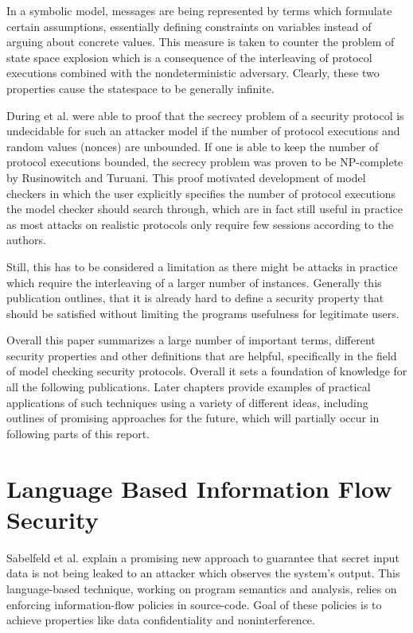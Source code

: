 \documentclass[a4paper,UKenglish]{lipics-v2018}
\begin{document}
In a symbolic model, messages are being represented by terms which formulate certain assumptions, essentially defining constraints on variables instead of arguing about concrete values. This measure is taken to counter the problem of state space explosion which is a consequence of the interleaving of protocol executions combined with the nondeterministic adversary. Clearly, these two properties cause the statespace to be generally infinite.\cite{model_checking_security_protocols}

During et al. were able to proof that the secrecy problem of a security protocol is undecidable for such an attacker model if the number of protocol executions and random values (nonces) are unbounded.\cite{DLMS99} If one is able to keep the number of protocol executions bounded, the secrecy problem was proven to be NP-complete by Rusinowitch and Turuani.\cite{RT01} This proof motivated development of model checkers in which the user explicitly specifies the number of protocol executions the model checker should search through, which are in fact still useful in practice as most attacks on realistic protocols only require few sessions according to the authors.\cite{model_checking_security_protocols}

Still, this has to be considered a limitation as there might be attacks in practice which require the interleaving of a larger number of instances. Generally this publication outlines, that it is already hard to define a security property that should be satisfied without limiting the programs usefulness for legitimate users.

Overall this paper summarizes a large number of important terms, different security properties and other definitions that are helpful, specifically in the field of model checking security protocols. Overall it sets a foundation of knowledge for all the following publications. Later chapters provide examples of practical applications of such techniques using a variety of different ideas, including outlines of promising approaches for the future, which will partially occur in following parts of this report. 



\section{Language Based Information Flow Security}

Sabelfeld et al. explain a promising new approach to guarantee that secret input data is not being leaked to an attacker which observes the system's output. This language-based technique, working on program semantics and analysis, relies on enforcing information-flow policies in source-code. Goal of these policies is to achieve properties like data confidentiality and noninterference.\cite{language_based_information_flow_security}
\end{document}
